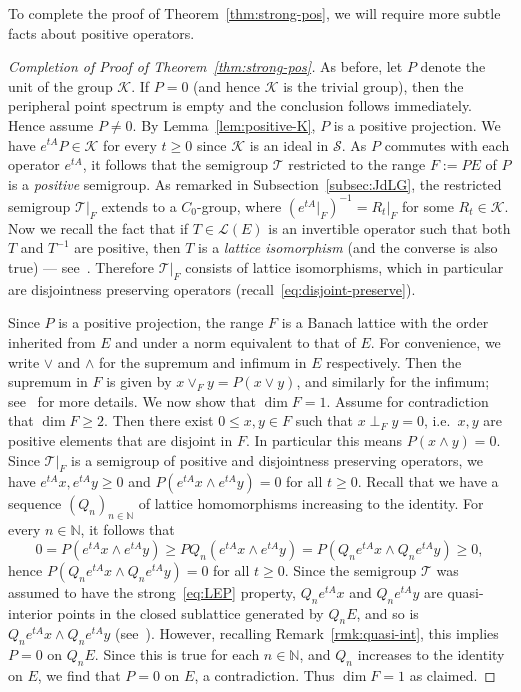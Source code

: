 \documentclass[sn-mathphys]{sn-jnl}%
\theoremstyle{thmstyleone}
\theoremstyle{thmstylethree}
\newcommand{\NN}{\mathbb{N}}
\begin{document}
To complete the proof of Theorem~\ref{thm:strong-pos}, we will require more subtle facts about positive operators.
\begin{proof}[Completion of Proof of Theorem~\ref{thm:strong-pos}]
	As before, let $P$ denote the unit of the group $\mathcal{K}$. If $P=0$ (and hence $\mathcal{K}$ is the trivial group), then the peripheral point spectrum is empty and the conclusion follows immediately. Hence assume $P\ne 0$. By Lemma~\ref{lem:positive-K}, $P$ is a positive projection. We have $e^{tA}P\in\mathcal{K}$ for every $t\ge 0$ since $\mathcal{K}$ is an ideal in $\mathcal{S}$. As $P$ commutes with each operator $e^{tA}$, it follows that the semigroup $\mathcal{T}$ restricted to the range $F:=PE$ of $P$ is a \emph{positive} semigroup. As remarked in Subsection~\ref{subsec:JdLG}, the restricted semigroup $\mathcal{T}\vert_F$ extends to a $C_0$-group, where $(e^{tA}\vert_F)^{-1}=R_t\vert_F$ for some $R_t\in\mathcal{K}$. Now we recall the fact that if $T\in\mathcal{L}(E)$ is an invertible operator such that both $T$ and $T^{-1}$ are positive, then $T$ is a \emph{lattice isomorphism} (and the converse is also true) --- see~\cite[Theorem 2.15]{AB}. Therefore $\mathcal{T}\vert_F$ consists of lattice isomorphisms, which in particular are disjointness preserving operators (recall~\eqref{eq:disjoint-preserve}).
	
	Since $P$ is a positive projection, the range $F$ is a Banach lattice with the order inherited from $E$ and under a norm equivalent to that of $E$. For convenience, we write $\vee$ and $\wedge$ for the supremum and infimum in $E$ respectively. Then the supremum in $F$ is given by $x\vee_F y = P(x\vee y)$, and similarly for the infimum; see~\cite[Chapter III, Proposition 11.5]{Sch} for more details. We now show that $\dim F=1$. Assume for contradiction that $\dim F \ge 2$. Then there exist $0 \le x,y\in F$ such that $x\perp_F y=0$, i.e.\ $x,y$ are positive elements that are disjoint in $F$. In particular this means $P(x\wedge y)=0$. Since $\mathcal{T}\vert_F$ is a semigroup of positive and disjointness preserving operators, we have $e^{tA}x, e^{tA}y \ge 0$ and $P(e^{tA}x\wedge e^{tA}y)=0$ for all $t\ge 0$. Recall that we have a sequence $(Q_n)_{n\in\NN}$ of lattice homomorphisms increasing to the identity. For every $n\in\NN$, it follows that
	\begin{equation*}
		0 = P(e^{tA}x\wedge e^{tA}y) \ge PQ_n (e^{tA}x\wedge e^{tA}y) = P(Q_n e^{tA}x\wedge Q_n e^{tA}y) \ge 0,
	\end{equation*}
	hence $P(Q_n e^{tA}x\wedge Q_n e^{tA}y)=0$ for all $t\ge 0$. Since the semigroup $\mathcal{T}$ was assumed to have the strong~\eqref{eq:LEP} property, $Q_n e^{tA}x$ and $Q_n e^{tA}y$ are quasi-interior points in the closed sublattice generated by $Q_n E$, and so is $Q_n e^{tA}x\wedge Q_n e^{tA}y$ (see~\cite[Chapter II, Proposition 6.2]{Sch}). However, recalling Remark~\ref{rmk:quasi-int}, this implies $P=0$ on $Q_n E$. Since this is true for each $n\in\NN$, and $Q_n$ increases to the identity on $E$, we find that $P=0$ on $E$, a contradiction. Thus $\dim F=1$ as claimed.
	

\end{proof}
\end{document}
